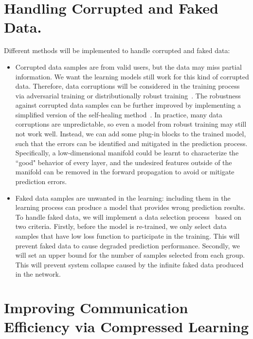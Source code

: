 \documentclass[11pt,letterpaper]{article}
\begin{document}
\section{Handling Corrupted and Faked Data.}
Different methods will be implemented to handle corrupted and faked data:
\begin{itemize}
    \item Corrupted data samples are from valid users, but the data may miss partial information. We want the learning models still work for this kind of corrupted data. Therefore, data corruptions will be considered in the training process via adversarial training or distributionally robust training~\cite{sattler2019robust}. The robustness against corrupted data samples can be further improved by implementing a simplified version of the self-healing method~\cite{chen2022self}. In practice, many data corruptions are unpredictable, so even a model from robust training may still not work well. Instead, we can add some plug-in blocks to the trained model, such that the errors can be identified and mitigated in the prediction process. Specifically, a low-dimensional manifold could be learnt to characterize the ``good" behavior of every layer, and the undesired features outside of the manifold can be removed in the forward propagation to avoid or mitigate prediction errors.
    
    \item Faked data samples are unwanted in the learning: including them in the learning process can produce a model that provides wrong prediction results. To handle faked data, we will implement a data selection process~\cite{roh2021sample} based on two criteria. Firstly, before the model is re-trained, we only select data samples that have low loss function to participate in the training. This will prevent faked data to cause degraded prediction performance. Secondly, we will set an upper bound for the number of samples selected from each group. This will prevent system collapse caused by the infinite faked data produced in the network. 
\end{itemize}


\section{Improving Communication Efficiency via Compressed Learning}
\end{document}
